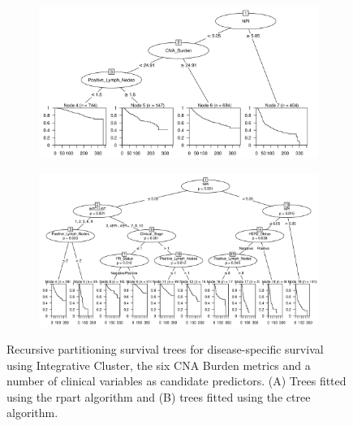 \begin{figure}[!h]
\centering

\vspace{1cm}

\begin{subfigure}{\textwidth}
\subcaption{}
\includegraphics[width=1\textwidth]{../figures/Chapter_3/Clin_PartyKit_Survival_Burden_DSS_INTCLUST.png}
\end{subfigure}

\vspace{3cm}

\begin{subfigure}{\textwidth}
\subcaption{}
\includegraphics[width=1\textwidth]{../figures/Chapter_3/Clin_Ctree_Survival_Burden_DSS_INTCLUST.png}
\end{subfigure}

\vspace{1cm}

\caption[Recursive partitioning survival trees for disease-specific survival using Integrative Cluster, the six CNA Burden metrics and a number of clinical variables as candidate predictors.]{Recursive partitioning survival trees for disease-specific survival using Integrative Cluster, the six CNA Burden metrics and a number of clinical variables as candidate predictors. (A) Trees fitted using the rpart algorithm and (B) trees fitted using the ctree algorithm.}
\label{fig:INTCLUST_CNA_Burden_DSS_Clin}
\end{figure}

